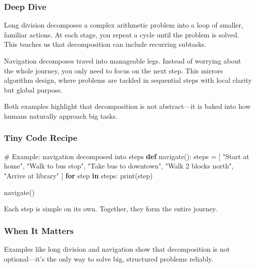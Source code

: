 \documentclass[
  letterpaper,
  DIV=11,
  numbers=noendperiod]{scrreprt}
\newenvironment{Shaded}{\begin{snugshade}}{\end{snugshade}}
\newcommand{\BuiltInTok}[1]{\textcolor[rgb]{0.00,0.23,0.31}{#1}}
\newcommand{\CommentTok}[1]{\textcolor[rgb]{0.37,0.37,0.37}{#1}}
\newcommand{\ControlFlowTok}[1]{\textcolor[rgb]{0.00,0.23,0.31}{\textbf{#1}}}
\newcommand{\KeywordTok}[1]{\textcolor[rgb]{0.00,0.23,0.31}{\textbf{#1}}}
\newcommand{\NormalTok}[1]{\textcolor[rgb]{0.00,0.23,0.31}{#1}}
\newcommand{\OperatorTok}[1]{\textcolor[rgb]{0.37,0.37,0.37}{#1}}
\newcommand{\StringTok}[1]{\textcolor[rgb]{0.13,0.47,0.30}{#1}}
\begin{document}
\subsubsection{Deep Dive}\label{deep-dive-7}

Long division decomposes a complex arithmetic problem into a loop of
smaller, familiar actions. At each stage, you repeat a cycle until the
problem is solved. This teaches us that decomposition can include
recurring subtasks.

Navigation decomposes travel into manageable legs. Instead of worrying
about the whole journey, you only need to focus on the next step. This
mirrors algorithm design, where problems are tackled in sequential steps
with local clarity but global purpose.

Both examples highlight that decomposition is not abstract---it is baked
into how humans naturally approach big tasks.

\subsubsection{Tiny Code Recipe}\label{tiny-code-recipe-35}

\begin{Shaded}
\begin{Highlighting}[]
\CommentTok{\# Example: navigation decomposed into steps}
\KeywordTok{def}\NormalTok{ navigate():}
\NormalTok{    steps }\OperatorTok{=}\NormalTok{ [}
        \StringTok{"Start at home"}\NormalTok{,}
        \StringTok{"Walk to bus stop"}\NormalTok{,}
        \StringTok{"Take bus to downtown"}\NormalTok{,}
        \StringTok{"Walk 2 blocks north"}\NormalTok{,}
        \StringTok{"Arrive at library"}
\NormalTok{    ]}
    \ControlFlowTok{for}\NormalTok{ step }\KeywordTok{in}\NormalTok{ steps:}
        \BuiltInTok{print}\NormalTok{(step)}

\NormalTok{navigate()}
\end{Highlighting}
\end{Shaded}

Each step is simple on its own. Together, they form the entire journey.

\subsubsection{When It Matters}\label{when-it-matters-35}

Examples like long division and navigation show that decomposition is
not optional---it's the only way to solve big, structured problems
reliably.
\end{document}

